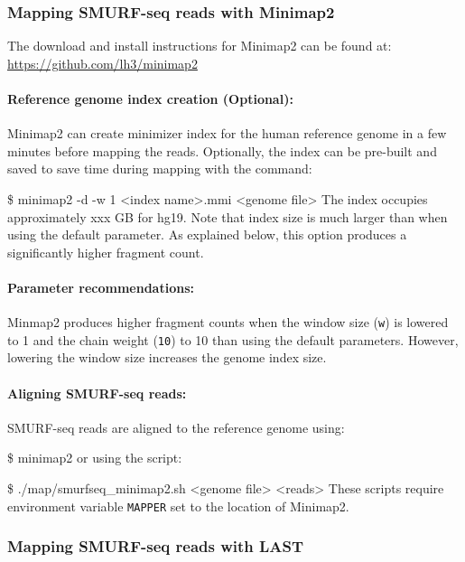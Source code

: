 \documentclass[11pt]{article}
\newenvironment{cmd}
{\list{}{
    \parsep=0em
    \itemindent=17pt
    \listparindent=50pt
    \leftmargin=0in
    \rightmargin=0in
  }\item[] \ttfamily \$}
{\endlist}
\begin{document}
\subsubsection{Mapping SMURF-seq reads with Minimap2}
\label{minimap}

The download and install instructions for Minimap2 can be found at:
\url{https://github.com/lh3/minimap2}

\paragraph{Reference genome index creation (Optional):}
Minimap2 can create minimizer index for the human reference genome in
a few minutes before mapping the reads. Optionally, the
index can be pre-built and saved to save time during mapping with
the command:
\begin{cmd}
  minimap2 -d -w 1 <index name>.mmi <genome file>
\end{cmd}
The index occupies approximately xxx GB for hg19. Note that index size
is much larger than when using the default parameter. As explained below,
this option produces a significantly higher fragment count.

\paragraph{Parameter recommendations:}
Minmap2 produces higher fragment counts when the window size (\texttt{w}) 
is lowered to 1 and the chain weight (\texttt{10}) to 10 than using the
default parameters. However, lowering the window size increases the
genome index size.


\paragraph{Aligning SMURF-seq reads:}
SMURF-seq reads are aligned to the reference genome using:
\begin{cmd}
  minimap2
\end{cmd}
or using the script:
\begin{cmd}
  ./map/smurfseq\_minimap2.sh <genome file> <reads>
\end{cmd}
These scripts require environment variable \texttt{MAPPER} set to the
location of Minimap2.

\subsubsection{Mapping SMURF-seq reads with LAST}
\label{last}
\end{document}

